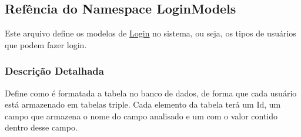 \hypertarget{namespaceLoginModels}{\subsection{Refência do Namespace Login\-Models}
\label{namespaceLoginModels}
}


Este arquivo define os modelos de \hyperlink{namespaceLogin}{Login} no sistema, ou seja, os tipos de usuários que podem fazer login.  




\subsubsection{Descrição Detalhada}
Define como é formatada a tabela no banco de dados, de forma que cada usuário está armazenado em tabelas triple. Cada elemento da tabela terá um Id, um campo que armazena o nome do campo analisado e um com o valor contido dentro desse campo. 